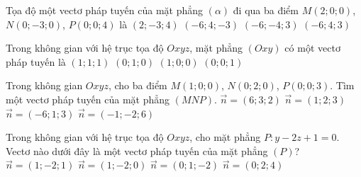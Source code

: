 \begin{ex}%
	Tọa độ một vectơ pháp tuyến của mặt phẳng $ (\alpha)$ đi qua ba điểm $M(2;0;0)$, $N(0;-3;0)$, $P(0;0;4)$ là     
	\choice
	{$(2;-3;4)$}
	{\True $(-6;4;-3)$}
	{$(-6;-4;3)$}
	{$(-6;4;3)$}
\end{ex}
\begin{ex}%
	Trong không gian với hệ trục tọa độ $Oxyz$, mặt phẳng $(Oxy)$ có một vectơ pháp tuyến là
	\choice
	{$(1;1;1)$}
	{$(0;1;0)$}
	{$(1;0;0)$}
	{\True $(0;0;1)$}
\end{ex}
\begin{ex}%
	Trong không gian $Oxyz$, cho ba điểm $M(1;0;0)$, $N(0;2;0)$, $P(0;0;3)$. Tìm một vectơ pháp tuyến của mặt phẳng $(MNP)$.
	\choice
	{\True $\vec{n}=(6;3;2)$}
	{$\vec{n}=(1;2;3)$}
	{$\vec{n}=(-6;1;3)$}
	{$\vec{n}=(-1;-2;6)$}
\end{ex}
\begin{ex}%
	Trong không gian với hệ trục tọa độ $Oxyz$, cho mặt phẳng $P \colon y-2z+1=0$. Vectơ nào dưới đây là một vectơ pháp tuyến của mặt phẳng $(P)$?
	\choice
	{ $\vec{n}=(1;-2;1)$}
	{$ \vec{n}=(1;-2;0)$}
	{\True $  \vec{n}=(0;1;-2)$}
	{$ \vec{n}=(0;2;4)$}
\end{ex}
